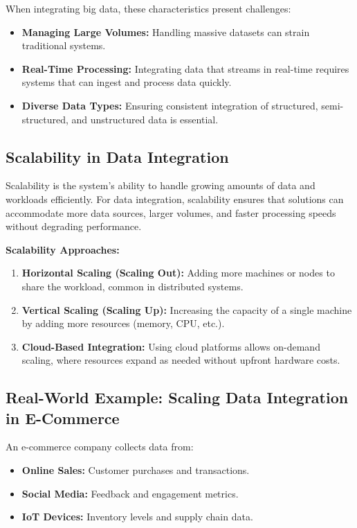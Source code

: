 \documentclass[12pt]{article}
\begin{document}
When integrating big data, these characteristics present challenges:
\begin{itemize}
    \item \textbf{Managing Large Volumes:} Handling massive datasets can strain traditional systems.
    \item \textbf{Real-Time Processing:} Integrating data that streams in real-time requires systems that can ingest and process data quickly.
    \item \textbf{Diverse Data Types:} Ensuring consistent integration of structured, semi-structured, and unstructured data is essential.
\end{itemize}

\subsection{Scalability in Data Integration}
Scalability is the system’s ability to handle growing amounts of data and workloads efficiently. For data integration, scalability ensures that solutions can accommodate more data sources, larger volumes, and faster processing speeds without degrading performance.

\textbf{Scalability Approaches:}
\begin{enumerate}
    \item \textbf{Horizontal Scaling (Scaling Out):} Adding more machines or nodes to share the workload, common in distributed systems.
    \item \textbf{Vertical Scaling (Scaling Up):} Increasing the capacity of a single machine by adding more resources (memory, CPU, etc.).
    \item \textbf{Cloud-Based Integration:} Using cloud platforms allows on-demand scaling, where resources expand as needed without upfront hardware costs.
\end{enumerate}

\subsection{Real-World Example: Scaling Data Integration in E-Commerce}
An e-commerce company collects data from:
\begin{itemize}
    \item \textbf{Online Sales:} Customer purchases and transactions.
    \item \textbf{Social Media:} Feedback and engagement metrics.
    \item \textbf{IoT Devices:} Inventory levels and supply chain data.
\end{itemize}
\end{document}
